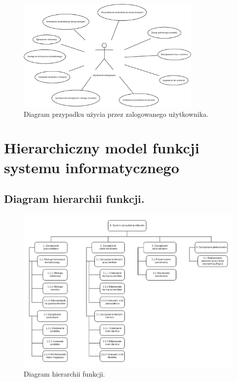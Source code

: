 \documentclass[a4paper,11pt]{article}
\begin{document}
\begin{figure}[H]
	\centering
		\includegraphics[width=0.8\textwidth]{Diagramy/PrzypadkiUzycia/Zalogowany.jpeg}
	\caption{Diagram przypadku użycia przez zalogowanego użytkownika.}
\end{figure}


\section {Hierarchiczny model funkcji systemu informatycznego}
\subsection {Diagram hierarchii funkcji.}

\begin{figure}[H]
	\centering
		\includegraphics[width=1\textwidth]{Diagramy/HierarchiiFunkcji.png}
	\caption{Diagram hierarchii funkcji.}
\end{figure}
\end{document}

